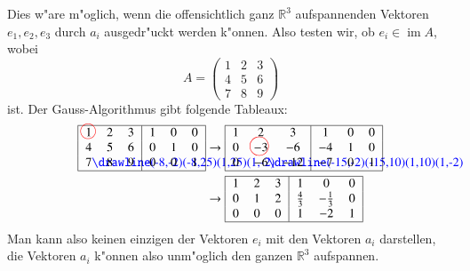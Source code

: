 \begin{beispiel}
Dies w"are m"oglich, wenn die offensichtlich ganz $\mathbb R^3$
aufspannenden Vektoren $e_1,e_2,e_3$ durch $a_i$ ausgedr"uckt werden
k"onnen. Also testen wir, ob $e_i\in \operatorname{im}A$, wobei
\[
A=\begin{pmatrix}
1&2&3\\
4&5&6\\
7&8&9
\end{pmatrix}
\]
ist. Der Gauss-Algorithmus gibt folgende Tableaux:
\begin{align*}
\begin{tabular}{|>{$}c<{$}>{$}c<{$}>{$}c<{$}|>{$}c<{$}>{$}c<{$}>{$}c<{$}|}
\hline
1%
\begin{picture}(0,0)
\color{red}\put(-3,4){\circle{12}}
\end{picture}%
&2&3&1&0&0\\
4&5&6&0&1&0\\
7%
\begin{picture}(0,0)
\color{blue}\drawline(-8,-2)(-8,25)(1,25)(1,-2)
\end{picture}%
&8&9&0&0&1\\
\hline
\end{tabular}
&\rightarrow
\begin{tabular}{|>{$}c<{$}>{$}c<{$}>{$}c<{$}|>{$}c<{$}>{$}c<{$}>{$}c<{$}|}
\hline
1&2&3&1&0&0\\
0&-3%
\begin{picture}(0,0)
\color{red}\put(-7,4){\circle{15}}
\end{picture}%
&-6&-4&1&0\\
0&-6%
\begin{picture}(0,0)
\color{blue}\drawline(-15,-2)(-15,10)(1,10)(1,-2)
\end{picture}%
&-12&-7&0&1\\
\hline
\end{tabular}
\\
&\rightarrow
\begin{tabular}{|>{$}c<{$}>{$}c<{$}>{$}c<{$}|>{$}c<{$}>{$}c<{$}>{$}c<{$}|}
\hline
1&2&3&1&0&0\\
0&1&2&\frac43&-\frac13&0\\
0&0&0&1&-2&1\\
\hline
\end{tabular}
\end{align*}
Man kann also keinen einzigen der Vektoren $e_i$ mit den Vektoren $a_i$
darstellen, die Vektoren $a_i$ k"onnen also unm"oglich den ganzen
$\mathbb R^3$ aufspannen.
\end{beispiel}

